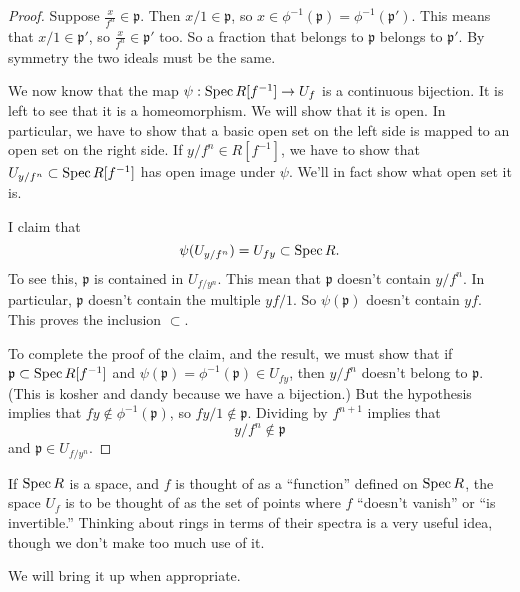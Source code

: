 \begin{proof}
Suppose $\frac{x}{f^n} \in \mathfrak{p}$. Then $x/1 \in
\mathfrak{p}$, so $x
\in \phi^{-1}(\mathfrak{p}) = \phi^{-1}(\mathfrak{p}')$. This
means that $x/1
\in \mathfrak{p}'$, so 
$\frac{x}{f^n} \in \mathfrak{p}'$ too. So a fraction that
belongs to
$\mathfrak{p}$ belongs to $\mathfrak{p}'$. By symmetry the two
ideals must be
the same.  
\item We now know that the map $\psi: \operatorname{Spec} R[f^{-1}] \to U_f$
is a continuous
bijection. It is left to see that it is a homeomorphism. We will
show that it
is open.  
In particular, we have to show that a basic open set on the left
side is mapped
to an open set on the right side.
If $y/f^n \in R[f^{-1}]$, we have to show that $U_{y/f^n}
\subset \operatorname{Spec}
R[f^{-1}]$ has open image under $\psi$. We'll in fact show what
open set it is.

I claim that
\[ \psi(U_{y/f^n}) = U_{fy} \subset \operatorname{Spec} R.  \]
To see this, $\mathfrak{p}$ is contained in $U_{f/y^n}$. This
mean that
$\mathfrak{p}$ doesn't contain $y/f^n$. In particular,
$\mathfrak{p}$ doesn't
contain the multiple $yf/1$. So $\psi(\mathfrak{p})$ doesn't
contain $yf$.
This proves the inclusion $\subset$.  

To complete the proof of the claim, and
the result, we must show that if $\mathfrak{p} \subset \operatorname{Spec}
R[f^{-1}]$ and
$\psi(\mathfrak{p}) = \phi^{-1}(\mathfrak{p}) \in U_{fy}$, then
$y/f^n$ doesn't
belong to $\mathfrak{p}$. (This is kosher and dandy because we
have a bijection.) But the hypothesis implies that $fy \notin
\phi^{-1}(\mathfrak{p})$, so $fy/1 \notin \mathfrak{p}$.
Dividing by $f^{n+1}$
implies that
\[ y/f^{n} \notin \mathfrak{p}  \]
and $\mathfrak{p} \in U_{f/y^n}$. 
\end{proof}

If $\operatorname{Spec} R$ is a space, and $f$ is thought of as a ``function''
defined on
$\operatorname{Spec} R$, the space $U_f$ is to be thought of as the set of
points where $f$
``doesn't vanish'' or ``is invertible.''
Thinking about rings in terms of their spectra is a very useful
idea, though we
don't make too much use of it. 

We will bring it up when appropriate.  

